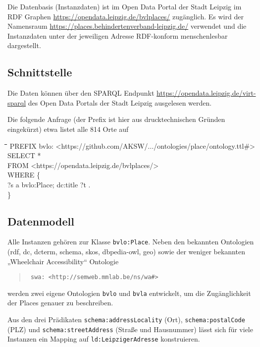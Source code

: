 \documentclass[a4paper,11pt]{article}
\newenvironment{code}{\tt \begin{tabbing}
\hskip12pt\=\hskip12pt\=\hskip12pt\=\hskip12pt\=\hskip5cm\=\hskip5cm\=\kill}
{\end{tabbing}}
\begin{document}
Die Datenbasis (Instanzdaten) ist im Open Data Portal der Stadt Leipzig im RDF
Graphen \url{https://opendata.leipzig.de/bvlplaces/} zugänglich.  Es wird der
Namensraum \url{https://places.behindertenverband-leipzig.de/} verwendet und
die Instanzdaten unter der jeweiligen Adresse RDF-konform menschenlesbar
dargestellt. 

\subsection{Schnittstelle}

Die Daten können über den SPARQL Endpunkt
\url{https://opendata.leipzig.de/virt-sparql} des Open Data Portals der Stadt
Leipzig ausgelesen werden.

Die folgende Anfrage (der Prefix ist hier aus drucktechnischen Gründen
eingekürzt) etwa listet alle 814 Orte auf
\begin{code}
  PREFIX bvlo: <https://github.com/AKSW/.../ontologies/place/ontology.ttl\#>\\
  SELECT *\\
  FROM <https://opendata.leipzig.de/bvlplaces/>\\
  WHERE \{\\\>
    ?s a bvlo:Place; dc:title ?t .\\
  \}
\end{code}

\subsection{Datenmodell}

Alle Instanzen gehören zur Klasse \texttt{bvlo:Place}.  Neben den bekannten
Ontologien (rdf, dc, dcterm, schema, skos, dbpedia-owl, geo) sowie der weniger
bekannten „Wheelchair Accessibility“ Ontologie
\begin{quote}\tt
  swa: <http://semweb.mmlab.be/ns/wa\#>
\end{quote}
werden zwei eigene Ontologien \texttt{bvlo} und \texttt{bvla} entwickelt, um
die Zugänglichkeit der Places genauer zu beschreiben.

Aus den drei Prädikaten \texttt{schema:addressLocality} (Ort),
\texttt{schema:postalCode} (PLZ) und \texttt{schema:streetAddress} (Straße und
Hausnummer) lässt sich für viele Instanzen ein Mapping auf
\texttt{ld:LeipzigerAdresse} konstruieren.
\end{document}
